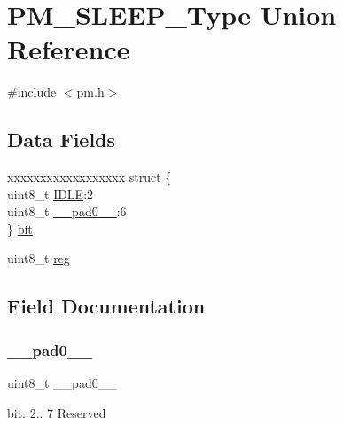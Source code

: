 \hypertarget{union_p_m___s_l_e_e_p___type}{}\section{P\+M\+\_\+\+S\+L\+E\+E\+P\+\_\+\+Type Union Reference}
\label{union_p_m___s_l_e_e_p___type}


{\ttfamily \#include $<$pm.\+h$>$}

\subsection*{Data Fields}
\begin{DoxyCompactItemize}
\item 
\begin{tabbing}
xx\=xx\=xx\=xx\=xx\=xx\=xx\=xx\=xx\=\kill
struct \{\\
\>uint8\_t \mbox{\hyperlink{union_p_m___s_l_e_e_p___type_ae30a73e18e1fdd27774cf45972e90c99}{IDLE}}:2\\
\>uint8\_t \mbox{\hyperlink{union_p_m___s_l_e_e_p___type_a8b4eebe79ded0459acec2f4950102ba3}{\_\_pad0\_\_}}:6\\
\} \mbox{\hyperlink{union_p_m___s_l_e_e_p___type_a5fb75ce1fa7a93f66d00e5a9d670a6c2}{bit}}\\

\end{tabbing}\item 
uint8\+\_\+t \mbox{\hyperlink{union_p_m___s_l_e_e_p___type_a9428adc9af4653a2050e2536b55dec8d}{reg}}
\end{DoxyCompactItemize}


\subsection{Field Documentation}
\mbox{\label{union_p_m___s_l_e_e_p___type_a8b4eebe79ded0459acec2f4950102ba3}} 
\subsubsection{\texorpdfstring{\_\_pad0\_\_}{\_\_pad0\_\_}}
{\footnotesize\ttfamily uint8\+\_\+t \+\_\+\+\_\+pad0\+\_\+\+\_\+}

bit\+: 2.. 7 Reserved \mbox{\label{union_p_m___s_l_e_e_p___type_a5fb75ce1fa7a93f66d00e5a9d670a6c2}} 
